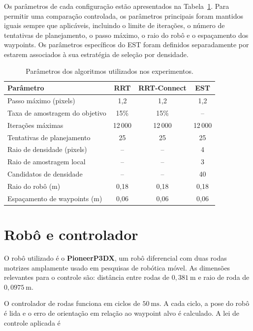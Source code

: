 Os parâmetros de cada configuração estão apresentados na Tabela~\ref{tab:parametros_algoritmos}. Para permitir uma comparação controlada, os parâmetros principais foram mantidos iguais sempre que aplicáveis, incluindo o limite de iterações, o número de tentativas de planejamento, o passo máximo, o raio do robô e o espaçamento dos waypoints. Os parâmetros específicos do EST foram definidos separadamente por estarem associados à sua estratégia de seleção por densidade.

\begin{table}[H]
\centering
\caption{Parâmetros dos algoritmos utilizados nos experimentos.}
\label{tab:parametros_algoritmos}
\begin{tabular}{lccc}
\toprule
Parâmetro & RRT & RRT-Connect & EST \\
\midrule
Passo máximo (pixels)          & 1,2      & 1,2      & 1,2      \\
Taxa de amostragem do objetivo & 15\%     & 15\%     & --       \\
Iterações máximas              & 12\,000  & 12\,000  & 12\,000  \\
Tentativas de planejamento     & 25       & 25       & 25       \\
Raio de densidade (pixels)     & --       & --       & 4        \\
Raio de amostragem local       & --       & --       & 3        \\
Candidatos de densidade        & --       & --       & 40       \\
Raio do robô (m)               & 0,18     & 0,18     & 0,18     \\
Espaçamento de waypoints (m)   & 0,06     & 0,06     & 0,06     \\
\bottomrule
\end{tabular}
\end{table}

\section{Robô e controlador}
\label{sec:robo_controlador}

O robô utilizado é o \textbf{PioneerP3DX}, um robô diferencial com duas rodas motrizes amplamente usado em pesquisas de robótica móvel. As dimensões relevantes para o controle são: distância entre rodas de $0{,}381~\text{m}$ e raio de roda de $0{,}0975~\text{m}$.

O controlador de rodas funciona em ciclos de $50~\text{ms}$. A cada ciclo, a pose do robô é lida e o erro de orientação em relação ao waypoint alvo é calculado. A lei de controle aplicada é

